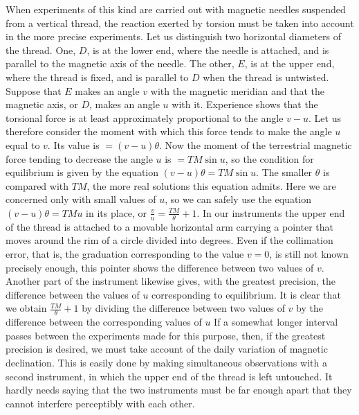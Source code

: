 When experiments of this kind are carried out with magnetic needles suspended from a vertical thread, the reaction exerted by torsion must be taken into account in the more precise experiments. Let us distinguish two horizontal diameters of the thread. One, $D$, is at the lower end, where the needle is attached, and is parallel to the magnetic axis of the needle. The other, $E$, is at the upper end, where the thread is fixed, and is parallel to $D$ when the thread is untwisted. Suppose that $E$ makes an angle $v$ with the magnetic meridian and that the magnetic axis, or $D$, makes an angle $u$ with it. Experience shows that the torsional force is at least approximately proportional to the angle $v-u$. Let us therefore consider the moment with which this force tends to make the angle $u$ equal to $v$. Its value is $=(v-u)\theta$. Now the moment of the terrestrial magnetic force tending to decrease the angle $u$ is $=TM\sin u$, so the condition for equilibrium is given by the equation $(v-u)\theta=TM\sin u$. The smaller $\theta$ is compared with $TM$, the more real solutions this equation admits. Here we are concerned only with small values of $u$, so we can safely use the equation $(v-u)\theta=TMu$ in its place, or $\frac vu=\frac{TM}{\theta}+1$. In our instruments the upper end of the thread is attached to a movable horizontal arm carrying a pointer that moves around the rim of a circle divided into degrees. Even if the collimation error, that is, the graduation corresponding to the value $v=0$, is still not known precisely enough, this pointer shows the difference between two values of $v$. Another part of the instrument likewise gives, with the greatest precision, the difference between the values of $u$ corresponding to equilibrium. It is clear that we obtain $\frac{TM}{\theta}+1$ by dividing the difference between two values of $v$ by the difference between the corresponding values of $u$ If a somewhat longer interval passes between the experiments made for this purpose, then, if the greatest precision is desired, we must take account of the daily variation of magnetic declination. This is easily done by making simultaneous observations with a second instrument, in which the upper end of the thread is left untouched. It hardly needs saying that the two instruments must be far enough apart that they cannot interfere perceptibly with each other.

